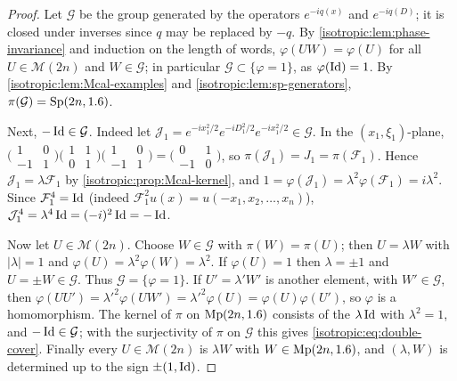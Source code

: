 \begin{proof}
Let $\mathcal G$ be the group generated by the operators $e^{-iq(x)}$ and
$e^{-iq(D)}$; it is closed under inverses since $q$ may be replaced by $-q$. By
\cref{isotropic:lem:phase-invariance} and induction on the length of words,
$\varphi(UW)=\varphi(U)$ for all $U\in\mathcal M(2n)$ and $W\in\mathcal G$; in
particular $\mathcal G\subset\{\varphi=1\}$, as $\varphi(\operatorname{Id})=1$. By
\cref{isotropic:lem:Mcal-examples} and \cref{isotropic:lem:sp-generators},
$\pi(\mathcal G)=\mathrm{Sp}(2n,1.6)$.

Next, $-\operatorname{Id}\in\mathcal G$. Indeed let
$\mathcal J_1=e^{-ix_1^2/2}e^{-iD_1^2/2}e^{-ix_1^2/2}\in\mathcal G$. In the
$(x_1,\xi_1)$-plane,
$\bigl(\begin{smallmatrix}1&0\\-1&1\end{smallmatrix}\bigr)\bigl(\begin{smallmatrix}1&1\\0&1\end{smallmatrix}\bigr)\bigl(\begin{smallmatrix}1&0\\-1&1\end{smallmatrix}\bigr)
=\bigl(\begin{smallmatrix}0&1\\-1&0\end{smallmatrix}\bigr)$, so
$\pi(\mathcal J_1)=J_1=\pi(\mathcal F_1)$. Hence $\mathcal J_1=\lambda\mathcal F_1$ by
\cref{isotropic:prop:Mcal-kernel}, and $1=\varphi(\mathcal J_1)=\lambda^2\varphi(\mathcal F_1)=i\lambda^2$.
Since $\mathcal F_1^4=\operatorname{Id}$ (indeed $\mathcal F_1^2u(x)=u(-x_1,x_2,\dots,x_n)$),
$\mathcal J_1^4=\lambda^4\operatorname{Id}=(-i)^2\operatorname{Id}=-\operatorname{Id}$.

Now let $U\in\mathcal M(2n)$. Choose $W\in\mathcal G$ with $\pi(W)=\pi(U)$; then
$U=\lambda W$ with $|\lambda|=1$ and $\varphi(U)=\lambda^2\varphi(W)=\lambda^2$.
If $\varphi(U)=1$ then $\lambda=\pm1$ and $U=\pm W\in\mathcal G$. Thus
$\mathcal G=\{\varphi=1\}$. If $U'=\lambda'W'$ is another element, with
$W'\in\mathcal G$, then
$\varphi(UU')=\lambda'^2\varphi(UW')=\lambda'^2\varphi(U)=\varphi(U)\varphi(U')$,
so $\varphi$ is a homomorphism. The kernel of $\pi$ on $\mathrm{Mp}(2n,1.6)$
consists of the $\lambda\operatorname{Id}$ with $\lambda^2=1$, and $-\operatorname{Id}\in\mathcal G$; with the
surjectivity of $\pi$ on $\mathcal G$ this gives \eqref{isotropic:eq:double-cover}.
Finally every $U\in\mathcal M(2n)$ is $\lambda W$ with $W\in\mathrm{Mp}(2n,1.6)$,
and $(\lambda,W)$ is determined up to the sign $\pm(1,\operatorname{Id})$.
\end{proof}


